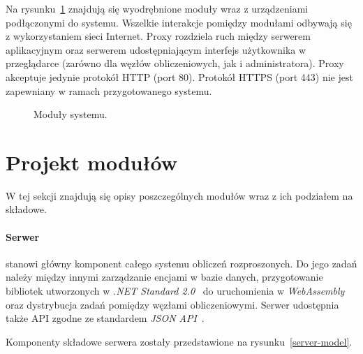 \documentclass[a4paper,11pt,twoside]{report}
\theoremstyle{definition}
\begin{document}
Na rysunku~\ref{project-model} znajdują się wyodrębnione moduły wraz z urządzeniami podłączonymi do systemu. Wszelkie interakcje pomiędzy modułami odbywają się z wykorzystaniem sieci Internet. Proxy rozdziela ruch między serwerem aplikacyjnym oraz serwerem udostępniającym interfejs użytkownika w przeglądarce (zarówno dla węzłów obliczeniowych, jak i administratora). Proxy akceptuje jedynie protokół HTTP (port 80). Protokół HTTPS (port 443) nie jest zapewniany w ramach przygotowanego systemu.


\begin{figure} 
    \caption{Moduły systemu.}
    \label{project-model}
\end{figure}

\section{Projekt modułów}

W tej sekcji znajdują się opisy poszczególnych modułów wraz z ich podziałem na składowe.

\paragraph{Serwer}

stanowi główny komponent całego systemu obliczeń rozproszonych. Do jego zadań należy między innymi zarządzanie encjami w bazie danych, przygotowanie bibliotek utworzonych w \textit{.NET Standard 2.0}~\cite{dotnet-standard} do uruchomienia w \textit{WebAssembly}~\cite{webassembly} oraz dystrybucja zadań pomiędzy węzłami obliczeniowymi. Serwer udostępnia także API zgodne ze standardem \textit{JSON API}~\cite{jsonapi}.

Komponenty składowe serwera zostały przedstawione na rysunku~\ref{server-model}.
\end{document}

